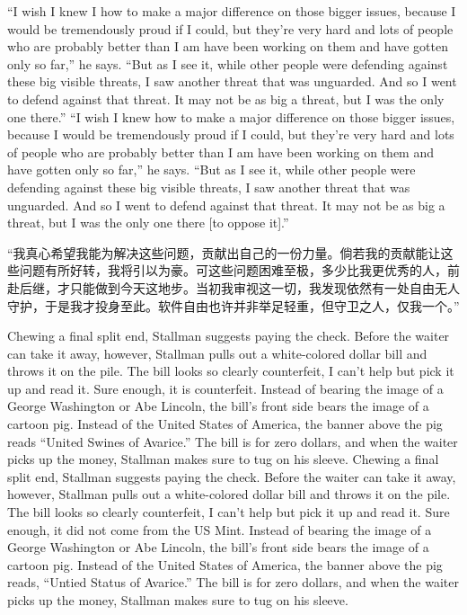 \ifdefined\eng
\ifdefined\vone
``I wish I knew I how to make a major difference on those bigger issues, because I would be tremendously proud if I could, but they're very hard and lots of people who are probably better than I am have been working on them and have gotten only so far,'' he says. ``But as I see it, while other people were defending against these big visible threats, I saw another threat that was unguarded. And so I went to defend against that threat. It may not be as big a threat, but I was the only one there.''
\fi
\ifdefined\vtwo
``I wish I knew how to make a major difference on those bigger issues, because I would be tremendously proud if I could, but they're very hard and lots of people who are probably better than I am have been working on them and have gotten only so far,'' he says. ``But as I see it, while other people were defending against these big visible threats, I saw another threat that was unguarded. And so I went to defend against that threat. It may not be as big a threat, but I was the only one there [to oppose it].''
\fi
\fi

\ifdefined\chs
``我真心希望我能为解决这些问题，贡献出自己的一份力量。倘若我的贡献能让这些问题有所好转，我将引以为豪。可这些问题困难至极，多少比我更优秀的人，前赴后继，才只能做到今天这地步。当初我审视这一切，我发现依然有一处自由无人守护，于是我才投身至此。软件自由也许并非举足轻重，但守卫之人，仅我一个。''
\fi

\ifdefined\eng
\ifdefined\vone
Chewing a final split end, Stallman suggests paying the check. Before the waiter can take it away, however, Stallman pulls out a white-colored dollar bill and throws it on the pile. The bill looks so clearly counterfeit, I can't help but pick it up and read it. Sure enough, it is counterfeit. Instead of bearing the image of a George Washington or Abe Lincoln, the bill's front side bears the image of a cartoon pig. Instead of the United States of America, the banner above the pig reads ``United Swines of Avarice.'' The bill is for zero dollars, and when the waiter picks up the money, Stallman makes sure to tug on his sleeve.
\fi
\ifdefined\vtwo
Chewing a final split end, Stallman suggests paying the check. Before the waiter can take it away, however, Stallman pulls out a white-colored dollar bill and throws it on the pile. The bill looks so clearly counterfeit, I can't help but pick it up and read it. Sure enough, it did not come from the US Mint. Instead of bearing the image of a George Washington or Abe Lincoln, the bill's front side bears the image of a cartoon pig. Instead of the United States of America, the banner above the pig reads, ``Untied Status of Avarice.'' The bill is for zero dollars, and when the waiter picks up the money, Stallman makes sure to tug on his sleeve.
\fi
\fi

